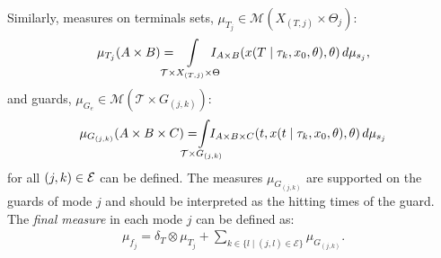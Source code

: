 Similarly, measures on terminals sets, $\mu_{T_j}\in \mathcal M(X_{(T,j)}\times \Theta_j)$:
\begin{align}
\mu_{T_j}(A\times B)= \hspace*{-4mm}\int\limits_{\mathcal T\times X_{(T,j)}\times \Theta}\hspace*{-4mm}I_{A\times B}(x(T\mid \tau_k,x_0,\theta),\theta)\,d\mu_{s_{j}},
\end{align}
and guards, $\mu_{ G_{e}}\in \mathcal M(\mathcal T\times  G_{(j,k)})$:
\begin{align}
\mu_{G_{(j,k)}}(A\times B\times C)=\hspace*{-5mm}\int\limits_{\mathcal T\times G_{(j,k)}}\hspace*{-5mm}I_{A\times B\times C}(t,x(t\mid \tau_k,x_0,\theta),\theta)\,d\mu_{s_{j}}
\end{align}
for all $(j,k) \in {\cal E}$ can be defined. 
The measures $\mu_{ G_{(j,k)}}$ are supported on the guards of mode $j$ and should be interpreted as the hitting times of the guard.
The {\em final measure} in each mode $j$ can be defined as:
\begin{align}
  \mu_{f_j}=\delta_T\otimes \mu_{T_j}+\sum_{k\in\{l\mid (j,l)\in \mathcal E\}}\mu_{ G_{(j,k)}}.
\label{eq:mu_T}
\end{align}

